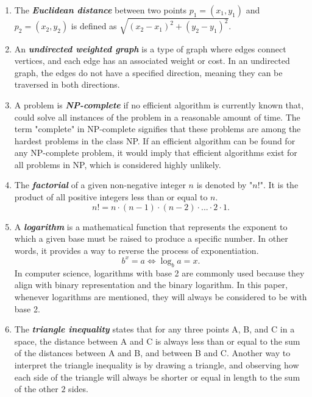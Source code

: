 \documentclass{article}
\begin{document}
\begin{enumerate}   %
 
  \item The \textbf{\textit{Euclidean distance}} between two points $p_1=(x_1,y_1)$ and $p_2=(x_2,y_2)$ is defined as $\sqrt{(x_2-x_1)^2+(y_2-y_1)^2}$. \label{Euclidean distance}
  \item An \textbf{\textit{undirected weighted graph}} is a type of graph where edges connect vertices, and each edge has an associated weight or cost. In an undirected graph, the edges do not have a specified direction, meaning they can be traversed in both directions.\label{undirected weighted graph}
  \item A problem is \textbf{\textit{NP-complete}} if no efficient algorithm is currently known that, could solve all instances of the problem in a reasonable amount of time. The term "complete" in NP-complete signifies that these problems are among the hardest problems in the class NP. If an efficient algorithm can be found for any NP-complete problem, it would imply that efficient algorithms exist for all problems in NP, which is considered highly unlikely. \label{NP-complete}
  \item The \textbf{\textit{factorial}} of a given non-negative integer $n$ is denoted by "$n!$". It is the product of all positive integers less than or equal to $n$.$$n! = n \cdot (n-1) \cdot (n-2) \cdot ... \cdot 2 \cdot 1 .$$\label{factorial}
  \item A \textbf{\textit{logarithm}} is a mathematical function that represents the exponent to which a given base must be raised to produce a specific number. In other words, it provides a way to reverse the process of exponentiation. $$b^x=a \Leftrightarrow \log_b{a}=x.$$ In computer science, logarithms with base 2 are commonly used because they align with binary representation and the binary logarithm.  In this paper, whenever logarithms are mentioned, they will always be considered to be with base 2.\label{logarithm}
  
  \item The \textbf{\textit{triangle inequality}} states that for any three points A, B, and C in a space, the distance between A and C is always less than or equal to the sum of the distances between A and B, and between B and C. Another way to interpret the triangle inequality is by drawing a triangle, and observing how each side of the triangle will always be shorter or equal in length to the sum of the other $2$ sides. \label{Triangle Inequality}
  

\end{enumerate}
\end{document}
